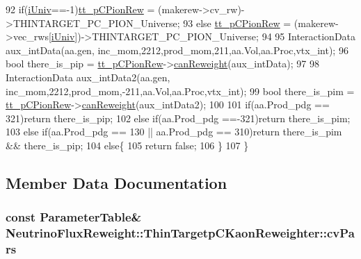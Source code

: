 \begin{DoxyCode}
92     \textcolor{keywordflow}{if}(\hyperlink{class_neutrino_flux_reweight_1_1_thin_targetp_c_kaon_reweighter_a3ff9d5c19007a8272c69e15cc3c7742b}{iUniv}==-1)\hyperlink{class_neutrino_flux_reweight_1_1_thin_targetp_c_kaon_reweighter_ab6dbf86a7f242f29d1f4e67bf1dc7e2f}{tt\_pCPionRew} = (makerew->cv\_rw)->THINTARGET\_PC\_PION\_Universe;
93     \textcolor{keywordflow}{else} \hyperlink{class_neutrino_flux_reweight_1_1_thin_targetp_c_kaon_reweighter_ab6dbf86a7f242f29d1f4e67bf1dc7e2f}{tt\_pCPionRew} = (makerew->vec\_rws[\hyperlink{class_neutrino_flux_reweight_1_1_thin_targetp_c_kaon_reweighter_a3ff9d5c19007a8272c69e15cc3c7742b}{iUniv}])->THINTARGET\_PC\_PION\_Universe;   
94 
95     InteractionData aux\_intData(aa.gen, inc\_mom,2212,prod\_mom,211,aa.Vol,aa.Proc,vtx\_int);   
96     \textcolor{keywordtype}{bool} there\_is\_pip = \hyperlink{class_neutrino_flux_reweight_1_1_thin_targetp_c_kaon_reweighter_ab6dbf86a7f242f29d1f4e67bf1dc7e2f}{tt\_pCPionRew}->\hyperlink{class_neutrino_flux_reweight_1_1_thin_targetp_c_pion_reweighter_a09067dcacb294ca133e2660d61302e85}{canReweight}(aux\_intData);    
97     
98     InteractionData aux\_intData2(aa.gen, inc\_mom,2212,prod\_mom,-211,aa.Vol,aa.Proc,vtx\_int);   
99     \textcolor{keywordtype}{bool} there\_is\_pim = \hyperlink{class_neutrino_flux_reweight_1_1_thin_targetp_c_kaon_reweighter_ab6dbf86a7f242f29d1f4e67bf1dc7e2f}{tt\_pCPionRew}->\hyperlink{class_neutrino_flux_reweight_1_1_thin_targetp_c_pion_reweighter_a09067dcacb294ca133e2660d61302e85}{canReweight}(aux\_intData2); 
100 
101     \textcolor{keywordflow}{if}(aa.Prod\_pdg == 321)\textcolor{keywordflow}{return} there\_is\_pip;
102     \textcolor{keywordflow}{else} \textcolor{keywordflow}{if}(aa.Prod\_pdg ==-321)\textcolor{keywordflow}{return} there\_is\_pim;
103     \textcolor{keywordflow}{else} \textcolor{keywordflow}{if}(aa.Prod\_pdg == 130 || aa.Prod\_pdg == 310)\textcolor{keywordflow}{return} there\_is\_pim && there\_is\_pip;
104     \textcolor{keywordflow}{else}\{
105       \textcolor{keywordflow}{return} \textcolor{keyword}{false};
106     \}
107   \}
\end{DoxyCode}


\subsection{Member Data Documentation}
\hypertarget{class_neutrino_flux_reweight_1_1_thin_targetp_c_kaon_reweighter_a474281c2bfbea82f8ddfad0cab1f1146}{
\subsubsection[{cv\-Pars}]{\setlength{\rightskip}{0pt plus 5cm}const {\bf Parameter\-Table}\& Neutrino\-Flux\-Reweight\-::\-Thin\-Targetp\-C\-Kaon\-Reweighter\-::cv\-Pars\hspace{0.3cm}{\ttfamily [private]}}}\label{class_neutrino_flux_reweight_1_1_thin_targetp_c_kaon_reweighter_a474281c2bfbea82f8ddfad0cab1f1146}


